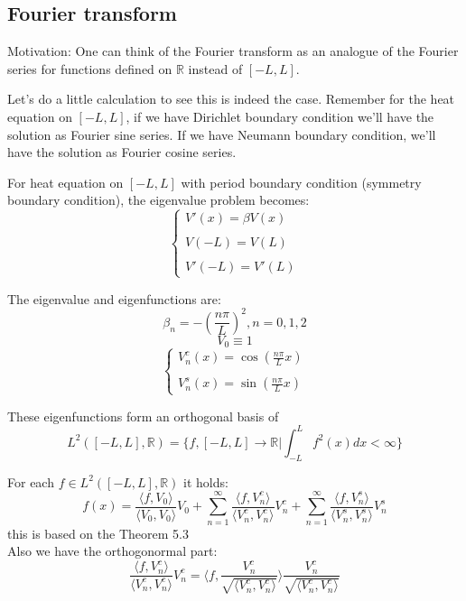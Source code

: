 \documentclass[12pt]{article} %
\begin{document}
\subsection{Fourier transform}
\hspace{5mm}
Motivation: One can think of the Fourier transform as an analogue of the Fourier series for functions defined on $\mathbb{R}$ instead of $[-L, L]$.\par
 Let's do a little calculation to see this is indeed the case. Remember for the heat equation on $[-L, L]$, if we have Dirichlet boundary condition we'll have the solution as Fourier sine series. If we have Neumann boundary condition, we'll have the solution as Fourier cosine series. \par
 For heat equation on $[-L, L]$ with period boundary condition (symmetry boundary condition), the eigenvalue problem becomes:
 $$
 \left\{
 \begin{array}{lll}
 V'(x) = \beta V(x) \\
 \\
 V(-L) = V(L)\\
 \\
V'(-L) = V'(L)
 \end{array}
 \right.
 $$\par
 The eigenvalue and eigenfunctions are:
 $$
 \beta_{n}= - \left( \frac{n\pi}{L}\right)^{2}, n=0, 1, 2
 $$
 $$
 V_{0} \equiv 1
 $$
 $$
  \left\{
 \begin{array}{lll}
 V_{n}^{c}(x) = \cos  \left( \frac{n\pi}{L}x\right)  \\
 \\
 V_{n}^{s}(x) = \sin  \left( \frac{n\pi}{L}x\right)
 \end{array}\right.
 $$\par
 These eigenfunctions form an orthogonal basis of 
 $$
 L^{2}([-L, L], \mathbb{R}) = \{ f, [-L, L] \to \mathbb{R} | \int_{-L}^{L} f^{2}(x) dx < \infty \}
 $$\par
 For each $f \in L^{2}([-L, L], \mathbb{R})$ it holds:
 \begin{equation}
 f(x) = \frac{\langle f, V_{0}\rangle}{\langle V_{0}, V_{0}\rangle}V_{0}+\sum_{n = 1}^{\infty}\frac{\langle f, V_{n}^{c}\rangle}{\langle V_{n}^{c}, V_{n}^{c}\rangle}V_{n}^{c}+\sum_{n = 1}^{\infty}\frac{\langle f, V_{n}^{s}\rangle}{\langle V_{n}^{s}, V_{n}^{s}\rangle}V_{n}^{s}
 \end{equation} this is based on the Theorem 5.3\\
 Also we have the orthogonormal part:
 $$
 \frac{\langle f, V_{n}^{c}\rangle}{\langle V_{n}^{c}, V_{n}^{c}\rangle}V_{n}^{c}=
 \langle f, \frac{V_{n}^{c}}{\sqrt{\langle V_{n}^{c}, V_{n}^{c}\rangle}}\rangle \frac{V_{n}^{c}}{\sqrt{\langle V_{n}^{c}, V_{n}^{c}\rangle}}
 $$
\end{document}
